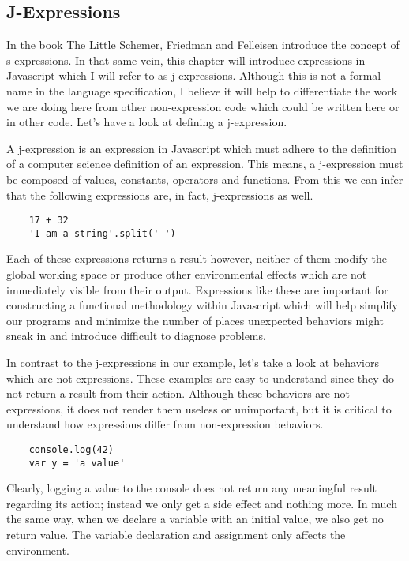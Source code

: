 \documentclass[a4paper,12pt,twoside]{book}
\begin{document}
\subsection{J-Expressions}
 
 In the book The Little Schemer, Friedman and Felleisen introduce the concept of s-expressions.  In that same vein, this chapter will introduce expressions in Javascript which I will refer to as j-expressions.  Although this is not a formal name in the language specification, I believe it will help to differentiate the work we are doing here from other non-expression code which could be written here or in other code. Let's have a look at defining a j-expression. 
 
 A j-expression is an expression in Javascript which must adhere to the definition of a computer science definition of an expression.  This means, a j-expression must be composed of values, constants, operators and functions. From this we can infer that the following expressions are, in fact, j-expressions as well.
 
\begin{lstlisting}
    17 + 32
    'I am a string'.split(' ')
\end{lstlisting}
 
 Each of these expressions returns a result however, neither of them modify the global working space or produce other environmental effects which are not immediately visible from their output.  Expressions like these are important for constructing a functional methodology within Javascript which will help simplify our programs and minimize the number of places unexpected behaviors might sneak in and introduce difficult to diagnose problems.
 
 In contrast to the j-expressions in our example, let's take a look at behaviors which are not expressions.  These examples are easy to understand since they do not return a result from their action. Although these behaviors are not expressions, it does not render them useless or unimportant, but it is critical to understand how expressions differ from non-expression behaviors.
 
\begin{lstlisting}
    console.log(42)
    var y = 'a value'
\end{lstlisting}
 
 Clearly, logging a value to the console does not return any meaningful result regarding its action; instead we only get a side effect and nothing more.  In much the same way, when we declare a variable with an initial value, we also get no return value. The variable declaration and assignment only affects the environment.
 
\end{document}
